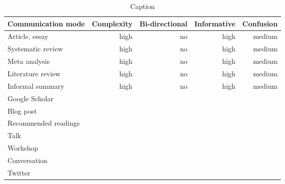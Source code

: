 \begin{table*}\centering
{}
\begin{tabular}{@{}lrrrr@{}}\toprule
Communication mode & Complexity & Bi-directional & Informative  & Confusion
\\\midrule
Article, essay & high & no & high & medium  \\
Systematic review & high & no & high & medium\\
Meta analysis & high & no & high & medium\\
Literature review & high & no & high & medium\\
Informal summary & high & no & high & medium\\
Google Scholar \\
Blog post \\
Recommended readings \\
Talk \\
Workshop \\
Conversation \\
Twitter \\


\bottomrule
\end{tabular}
\caption{Caption}
\end{table*}